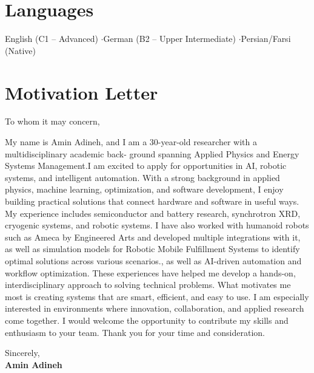 \documentclass[10pt, a4paper]{article}
\begin{document}
\section*{Languages}
\begin{center}
  English (C1 – Advanced) \quad$\cdot$\quad German (B2 – Upper Intermediate) \quad$\cdot$\quad Persian/Farsi (Native)
\end{center}

\newpage
\section*{Motivation Letter}
\vspace{1.5em}

To whom it may concern,
\vspace{1.5em}

My name is Amin Adineh, and I am a 30-year-old researcher with a multidisciplinary academic back-
ground spanning Applied Physics and Energy Systems Management.I am excited to apply for opportunities in AI, robotic systems, and intelligent automation. With a strong background in applied physics, machine learning, optimization, and software development, I enjoy building practical solutions that connect hardware and software in useful ways.
My experience includes semiconductor and battery research, synchrotron XRD, cryogenic systems, and robotic systems. I have also worked with humanoid robots such as Ameca by Engineered Arts and developed multiple integrations with it, as well as simulation models for Robotic Mobile Fulfillment Systems to identify optimal solutions across various scenarios., as well as AI-driven automation and workflow optimization. These experiences have helped me develop a hands-on, interdisciplinary approach to solving technical problems.
What motivates me most is creating systems that are smart, efficient, and easy to use. I am especially interested in environments where innovation, collaboration, and applied research come together.
I would welcome the opportunity to contribute my skills and enthusiasm to your team. Thank you for your time and consideration.

\vspace{3em}
Sincerely,  
\\[1.5em]
\textbf{Amin Adineh}
\end{document}
